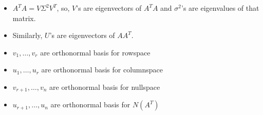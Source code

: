 \documentclass[a4paper,12pt]{article}
\theoremstyle{definition} \newtheorem{Theorem}{Theorem}
\begin{document}
\begin{itemize}
\item $A^T A = V \Sigma^2 V^T$, so, $V$'s are eigenvectors of $A^T A$ and $\sigma^2$'s are eigenvalues
of that matrix.
\item  Similarly, $U$'s are eigenvectors of $A A^T$.
\item $v_1, \ldots, v_r$ are orthonormal basis for rowspace
\item $u_1, \ldots, u_r$ are orthonormal basis for columnspace
\item $v_{r+1},\ldots, v_n$ are orthonormal basis for nullspace
\item $u_{r+1},\ldots, u_n$ are orthonormal basis for $N(A^T)$
\end{itemize}
\end{document}

